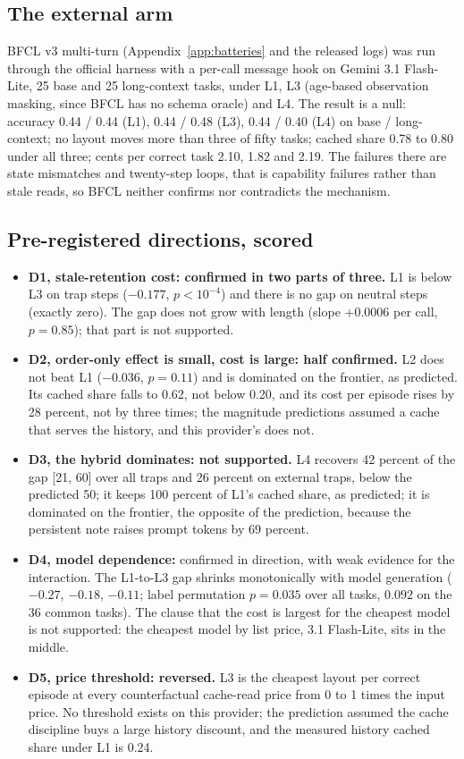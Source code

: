 \subsection{The external arm}
BFCL v3 multi-turn (Appendix~\ref{app:batteries} and the released logs) was run through the official harness with a per-call message hook on Gemini 3.1 Flash-Lite, 25 base and 25 long-context tasks, under L1, L3 (age-based observation masking, since BFCL has no schema oracle) and L4. The result is a null: accuracy 0.44 / 0.44 (L1), 0.44 / 0.48 (L3), 0.44 / 0.40 (L4) on base / long-context; no layout moves more than three of fifty tasks; cached share 0.78 to 0.80 under all three; cents per correct task 2.10, 1.82 and 2.19. The failures there are state mismatches and twenty-step loops, that is capability failures rather than stale reads, so BFCL neither confirms nor contradicts the mechanism.

\subsection{Pre-registered directions, scored}
\label{sec:prereg}

\begin{itemize}
\item \textbf{D1, stale-retention cost: confirmed in two parts of three.} L1 is below L3 on trap steps ($-0.177$, $p < 10^{-4}$) and there is no gap on neutral steps (exactly zero). The gap does not grow with length (slope $+0.0006$ per call, $p = 0.85$); that part is not supported.
\item \textbf{D2, order-only effect is small, cost is large: half confirmed.} L2 does not beat L1 ($-0.036$, $p = 0.11$) and is dominated on the frontier, as predicted. Its cached share falls to 0.62, not below 0.20, and its cost per episode rises by 28 percent, not by three times; the magnitude predictions assumed a cache that serves the history, and this provider's does not.
\item \textbf{D3, the hybrid dominates: not supported.} L4 recovers 42 percent of the gap [21, 60] over all traps and 26 percent on external traps, below the predicted 50; it keeps 100 percent of L1's cached share, as predicted; it is dominated on the frontier, the opposite of the prediction, because the persistent note raises prompt tokens by 69 percent.
\item \textbf{D4, model dependence:} confirmed in direction, with weak evidence for the interaction. The L1-to-L3 gap shrinks monotonically with model generation ($-0.27$, $-0.18$, $-0.11$; label permutation $p = 0.035$ over all tasks, $0.092$ on the 36 common tasks). The clause that the cost is largest for the cheapest model is not supported: the cheapest model by list price, 3.1 Flash-Lite, sits in the middle.
\item \textbf{D5, price threshold: reversed.} L3 is the cheapest layout per correct episode at every counterfactual cache-read price from 0 to 1 times the input price. No threshold exists on this provider; the prediction assumed the cache discipline buys a large history discount, and the measured history cached share under L1 is 0.24.
\end{itemize}

